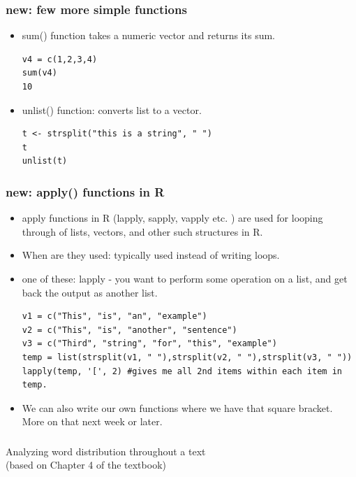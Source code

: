 \documentclass{beamer}
\begin{document}
\begin{frame}[fragile]
\frametitle{new: few more simple functions}
\begin{itemize}
\item sum() function takes a numeric vector and returns its sum.
\begin{verbatim}
v4 = c(1,2,3,4)
sum(v4)
10
\end{verbatim}
\item unlist() function: converts list to a vector. \scriptsize
\begin{verbatim}
t <- strsplit("this is a string", " ")
t
unlist(t)
\end{verbatim}
\end{itemize}
\end{frame}

\begin{frame}[fragile]
\frametitle{new: apply() functions in R}
\begin{itemize}
\item apply functions in R (lapply, sapply, vapply etc. ) are used for looping through of lists, vectors, and other such structures in R.
\item When are they used: typically used instead of writing loops.
\item one of these: lapply - you want to perform some operation on a list, and get back the output as another list. 
\pause \scriptsize \begin{verbatim}
v1 = c("This", "is", "an", "example")
v2 = c("This", "is", "another", "sentence")
v3 = c("Third", "string", "for", "this", "example")
temp = list(strsplit(v1, " "),strsplit(v2, " "),strsplit(v3, " "))
lapply(temp, '[', 2) #gives me all 2nd items within each item in temp.
\end{verbatim} \small
\item We can also write our own functions where we have that square bracket. More on that next week or later.
\end{itemize}
\end{frame}

\begin{frame}
\frametitle{}
\Large Analyzing word distribution throughout a text
\\ \small (based on Chapter 4 of the textbook)
\end{frame}
\end{document}
